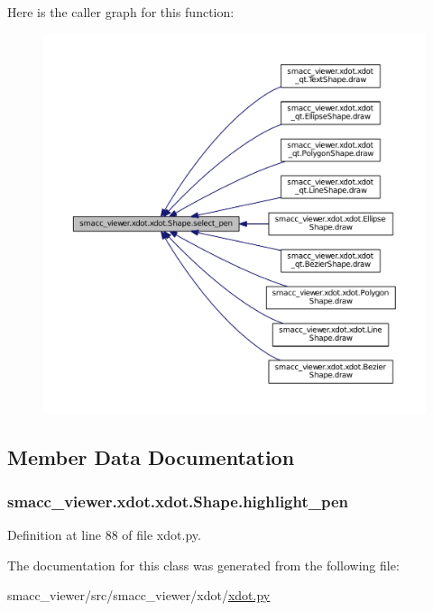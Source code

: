Here is the caller graph for this function\+:
\nopagebreak
\begin{figure}[H]
\begin{center}
\leavevmode
\includegraphics[width=350pt]{classsmacc__viewer_1_1xdot_1_1xdot_1_1Shape_a447a62283d0acd07b7bca2106d2de6e6_icgraph}
\end{center}
\end{figure}




\subsection{Member Data Documentation}
\subsubsection[{\texorpdfstring{highlight\+\_\+pen}{highlight_pen}}]{\setlength{\rightskip}{0pt plus 5cm}smacc\+\_\+viewer.\+xdot.\+xdot.\+Shape.\+highlight\+\_\+pen}\hypertarget{classsmacc__viewer_1_1xdot_1_1xdot_1_1Shape_ae625d4b65bd08e9bc7e8a0ca596d5128}{}\label{classsmacc__viewer_1_1xdot_1_1xdot_1_1Shape_ae625d4b65bd08e9bc7e8a0ca596d5128}


Definition at line 88 of file xdot.\+py.



The documentation for this class was generated from the following file\+:\begin{DoxyCompactItemize}
\item 
smacc\+\_\+viewer/src/smacc\+\_\+viewer/xdot/\hyperlink{xdot_8py}{xdot.\+py}\end{DoxyCompactItemize}
